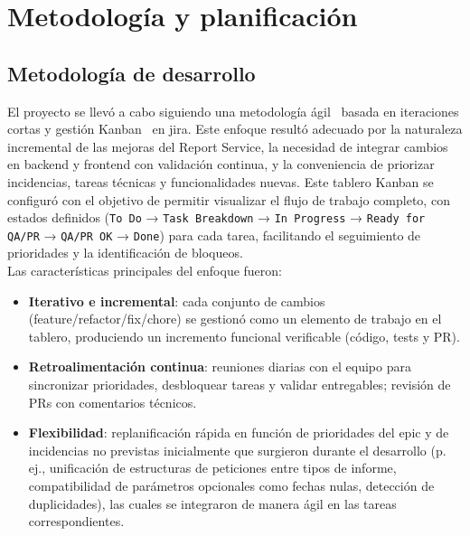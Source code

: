\documentclass[11pt,a4paper,titlepage,oneside]{report}
\begin{document}

\chapter{Metodología y planificación}

\section{Metodología de desarrollo}

El proyecto se llevó a cabo siguiendo una metodología ágil~\cite{AgileManifesto} basada en iteraciones cortas y gestión Kanban~\cite{AndersonKanban} en \gls{jira}. Este enfoque resultó adecuado por la naturaleza incremental de las mejoras del Report Service, la necesidad de integrar cambios en backend y frontend con validación continua, y la conveniencia de priorizar incidencias, tareas técnicas y funcionalidades nuevas. Este tablero Kanban se configuró con el objetivo de permitir visualizar el flujo de trabajo completo, con estados definidos (\texttt{To Do} → \texttt{Task Breakdown} → \texttt{In Progress} → \texttt{Ready for QA/PR} → \texttt{QA/PR OK} → \texttt{Done}) para cada tarea, facilitando el seguimiento de prioridades y la identificación de bloqueos.\\

Las características principales del enfoque fueron:

\begin{itemize}
  \item \textbf{Iterativo e incremental}: cada conjunto de cambios (feature/refactor/fix/chore) se gestionó como un elemento de trabajo en el tablero, produciendo un incremento funcional verificable (código, tests y PR).
  \item \textbf{Retroalimentación continua}: reuniones diarias con el equipo para sincronizar prioridades, desbloquear tareas y validar entregables; revisión de PRs con comentarios técnicos.
  \item \textbf{Flexibilidad}: replanificación rápida en función de prioridades del \acrshort{epic} y de incidencias no previstas inicialmente que surgieron durante el desarrollo (p.\,ej., unificación de estructuras de peticiones entre tipos de informe, compatibilidad de parámetros opcionales como fechas nulas, detección de duplicidades), las cuales se integraron de manera ágil en las tareas correspondientes.
\end{itemize}
\end{document}
